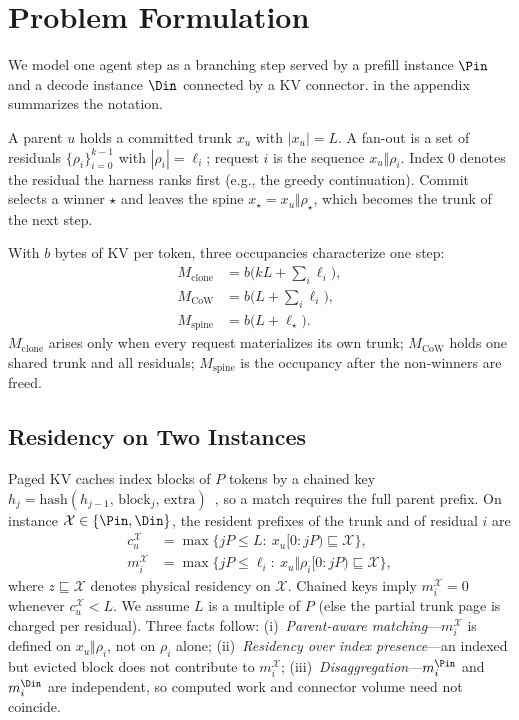 \section{Problem Formulation}
\label{sec:problem}

We model one agent step as a branching step served by a prefill instance $\Pin$ and a decode instance $\Din$ connected by a KV connector.
 in the appendix summarizes the notation.

\begin{definition}
\label{def:step}
A parent $u$ holds a committed trunk $x_u$ with $|x_u|{=}L$.
A fan-out is a set of residuals $\{\rho_i\}_{i=0}^{k-1}$ with $|\rho_i|{=}\ell_i$; request $i$ is the sequence $x_u\Vert\rho_i$.
Index $0$ denotes the residual the harness ranks first (e.g., the greedy continuation).
Commit selects a winner $\star$ and leaves the spine $x_\star=x_u\Vert\rho_\star$, which becomes the trunk of the next step.
\end{definition}

With $b$ bytes of KV per token, three occupancies characterize one step:
\begin{align}
M_{\mathrm{clone}} &= b\bigl(kL+\textstyle\sum_i\ell_i\bigr), \label{eq:mem}\\
M_{\mathrm{CoW}} &= b\bigl(L+\textstyle\sum_i\ell_i\bigr), \nonumber\\
M_{\mathrm{spine}} &= b\bigl(L+\ell_\star\bigr). \nonumber
\end{align}
$M_{\mathrm{clone}}$ arises only when every request materializes its own trunk; $M_{\mathrm{CoW}}$ holds one shared trunk and all residuals; $M_{\mathrm{spine}}$ is the occupancy after the non-winners are freed.

\subsection{Residency on Two Instances}
\label{sec:residency}

Paged KV caches index blocks of $P$ tokens by a chained key $h_j=\mathrm{hash}(h_{j-1},\,\text{block}_j,\,\text{extra})$~\cite{vllm,sglang}, so a match requires the full parent prefix.
On instance $\mathcal{X}\in\{\Pin,\Din\}$, the resident prefixes of the trunk and of residual $i$ are
\begin{align}
c_u^{\mathcal{X}} &= \max\{jP\le L:\ x_u[0{:}jP)\sqsubseteq\mathcal{X}\}, \label{eq:mi}\\
m_i^{\mathcal{X}} &= \max\{jP\le \ell_i:\ x_u\Vert\rho_i[0{:}jP)\sqsubseteq\mathcal{X}\}, \nonumber
\end{align}
where $z\sqsubseteq\mathcal{X}$ denotes physical residency on $\mathcal{X}$.
Chained keys imply $m_i^{\mathcal{X}}{=}0$ whenever $c_u^{\mathcal{X}}{<}L$.
We assume $L$ is a multiple of $P$ (else the partial trunk page is charged per residual).
Three facts follow:
(i)~\emph{Parent-aware matching}---$m_i^{\mathcal{X}}$ is defined on $x_u\Vert\rho_i$, not on $\rho_i$ alone;
(ii)~\emph{Residency over index presence}---an indexed but evicted block does not contribute to $m_i^{\mathcal{X}}$;
(iii)~\emph{Disaggregation}---$m_i^{\Pin}$ and $m_i^{\Din}$ are independent, so computed work and connector volume need not coincide.


